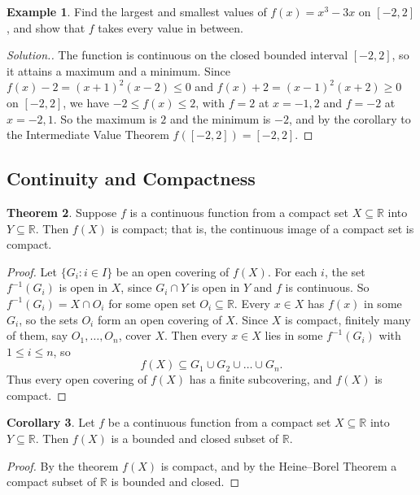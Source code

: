 \documentclass[11pt,a4paper]{article}
\numberwithin{equation}{section}
\theoremstyle{definition}
\newtheorem{thm}{Theorem}[subsection]
\newtheorem{exa}[thm]{Example}
\newtheorem{coro}[thm]{Corollary}
\newenvironment{solution}
  {\renewcommand{\qedsymbol}{}\begin{proof}[\textit{Solution}.]}
  {\end{proof}}
\begin{document}
\begin{exa}
Find the largest and smallest values of $f(x) = x^3-3x$ on $[-2,2]$, and show that $f$ takes every value in between.
\end{exa}

\begin{solution}
The function is continuous on the closed bounded interval $[-2,2]$, so it attains a maximum and a minimum. Since $f(x) - 2 = (x+1)^2(x-2)\leq 0$ and $f(x)+2 = (x-1)^2(x+2)\geq0$ on $[-2,2]$, we have $-2\leq f(x)\leq 2$, with $f = 2$ at $x = -1, 2$ and $f = -2$ at $x = -2, 1$. So the maximum is $2$ and the minimum is $-2$, and by the corollary to the Intermediate Value Theorem $f([-2,2]) = [-2,2]$.
\end{solution}


\subsection{Continuity and Compactness}

\begin{thm}
Suppose $f$ is a continuous function from a compact set $X\subseteq \mathbb{R}$ into $Y\subseteq \mathbb{R}$. Then $f(X)$ is compact; that is, the continuous image of a compact set is compact.
\end{thm}

\begin{proof}
Let $\{G_i : i\in I\}$ be an open covering of $f(X)$. For each $i$, the set $f^{-1}(G_i)$ is open in $X$, since $G_i\cap Y$ is open in $Y$ and $f$ is continuous. So $f^{-1}(G_i) = X\cap O_i$ for some open set $O_i\subseteq\mathbb{R}$. Every $x\in X$ has $f(x)$ in some $G_i$, so the sets $O_i$ form an open covering of $X$. Since $X$ is compact, finitely many of them, say $O_1,\dots,O_n$, cover $X$. Then every $x\in X$ lies in some $f^{-1}(G_i)$ with $1\leq i\leq n$, so
$$f(X) \subseteq G_1\cup G_2\cup\dots\cup G_n .$$
Thus every open covering of $f(X)$ has a finite subcovering, and $f(X)$ is compact.
\end{proof}


\begin{coro}
Let $f$ be a continuous function from a compact set $X\subseteq \mathbb{R}$ into $Y\subseteq \mathbb{R}$. Then $f(X)$ is a bounded and closed subset of $\mathbb{R}$.
\end{coro}

\begin{proof}
By the theorem $f(X)$ is compact, and by the Heine--Borel Theorem a compact subset of $\mathbb{R}$ is bounded and closed.
\end{proof}
\end{document}
